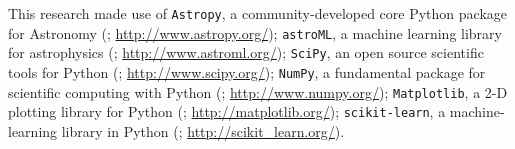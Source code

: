 \documentclass[useamsfonts]{pasj01}
\begin{document}
\begin{ack}
    This research made use of
    {\texttt{Astropy}}, 
        a community-developed core Python package for Astronomy (\citealt{Astropy}; 
        \url{http://www.astropy.org/}); 
    {\texttt{astroML}}, 
        a machine learning library for astrophysics (\citealt{astroml};
        \url{http://www.astroml.org/});
    {\texttt{SciPy}},
        an open source scientific tools for Python (\citealt{SciPy}; 
        \url{http://www.scipy.org/});
    {\texttt{NumPy}}, 
        a fundamental package for scientific computing with Python (\citealt{NumPy}; 
        \url{http://www.numpy.org/});
    {\texttt{Matplotlib}}, 
        a 2-D plotting library for Python (\citealt{Matplotlib}; 
        \url{http://matplotlib.org/});
    {\texttt{scikit-learn}},
        a machine-learning library in Python (\citealt{scikit-learn}; 
        \url{http://scikit_learn.org/}). 

\end{ack}


%


\end{document}
